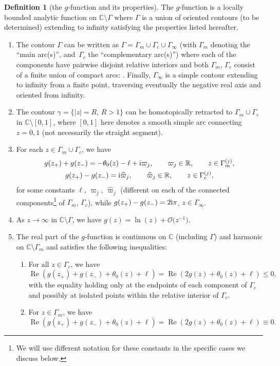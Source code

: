 \documentclass[10pt,a4paper]{amsart}
\numberwithin{equation}{section}
\theoremstyle{definition}
\newtheorem{Definition}[Theorem]{Definition}
\def\le{\left}
\def\ri{\right}
\def \wh{\widehat}
\def\C{{\mathbb C}}
\def\R{{\mathbb R}}
\def \Re{\operatorname{Re} }
\begin{document}
\begin{Definition}[the $g$-function and its properties]
\label{gdef}
The $g$-function is a locally bounded analytic function on $\C\setminus \Gamma$ where $\Gamma$ is a union of oriented contours (to be determined) extending to infinity satisfying the properties listed hereafter.
\begin{enumerate}\itemsep=0pt
\item[(1)] The contour $\Gamma$ can be written as $\Gamma = \Gamma_{m} \cup \Gamma_{c} \cup \Gamma_{\infty}$ (with $\Gamma_{m}$ denoting the ``main arc(s)'', and~$\Gamma_{c}$ the ``complementary arc(s)'') where each of the components have pairwise disjoint relative interiors and both $\Gamma_{m}$, $\Gamma_{c}$ consist of a finite union of compact arcs: . Finally, $\Gamma_\infty$ is a simple contour extending to infinity from a finite point, traversing eventually the negative real axis and oriented from infinity.
\item[(2)] The contour $\gamma=\{|z|=R, \, R>1\}$ can be homotopically retracted to $\Gamma_m\cup \Gamma_c$ in $\C \setminus [0,1]$, where $[0,1]$ here denotes a smooth simple arc connecting $z=0,1$ (not necessarily the straight segment).
\item[(3)] For each $z\in \Gamma_m\cup \Gamma_c$, we have
\begin{gather*}
g(z_+) + g(z_-) =- \theta_0(z) -\ell + {\rm i}{\varpi}_j, \qquad {\varpi}_j\in\R, \qquad z\in \Gamma_m^{(j)},\\
g(z_+)-g(z_-) = {\rm i} {\wh \varpi}_j, \qquad {\wh \varpi}_j\in\R, \qquad z\in \Gamma_c^{(j)},
\end{gather*}
for some constants $\ell$, $\varpi_j$, $\wh \varpi_j$ (different on each of the connected components\footnote{We will use different notation for these constants in the specific cases we discuss below.} of $\Gamma_m$, $ \Gamma_c$),
while
$
g(z_+)-g(z_-) = 2{\rm i}\pi$, $ z\in \Gamma_\infty$.
\item[(4)] As $z\to\infty$ in $\C\setminus \Gamma $, we have
$%
g(z) = \ln(z) + \mathcal O\bigl(z^{-1}\bigr)$.
\item[(5)] The real part of the $g$-function is continuous on $\C$ (including $\Gamma$) and harmonic on $\C \setminus \Gamma_m$ and
satisfies the following inequalities:
\begin{enumerate}\itemsep=0pt
\item[(i)] For all $z\in \Gamma_c$, we have
\[
\Re\le(g(z_+)+g(z_-)+ \theta_0(z) + \ell \ri) = \Re\le(2g(z)+ \theta_0(z) + \ell \ri) \leq 0,
\]
 with the equality holding only at the endpoints of each component of $\Gamma_c$ and possibly at isolated points within the relative interior of $\Gamma_c$.
\item[(ii)] For $z\in \Gamma_m$, we have
\[
\Re \le(g(z_+)+g(z_-)+ \theta_0(z) + \ell \ri)= \Re \le(2g(z)+ \theta_0(z) + \ell \ri) \equiv 0.
\]


\end{enumerate}
\end{enumerate}
\end{Definition}
\end{document}
